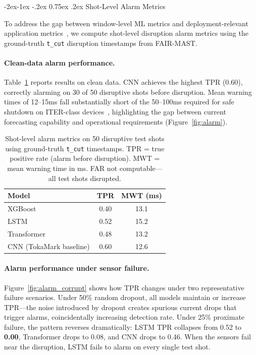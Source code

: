 \documentclass[10pt,twocolumn]{article}
\makeatletter
\renewcommand\subsection{\@startsection{subsection}{2}{\z@}%
  {-2ex\@plus -1ex \@minus -.2ex}%
  {0.75ex \@plus .2ex}%
  {\normalfont\large\bfseries}}
\makeatother
\begin{document}
\subsection{Shot-Level Alarm Metrics}
\label{sec:alarm}

To address the gap between window-level ML metrics and deployment-relevant
application metrics~\cite{rea2019, spangher2025}, we compute shot-level
disruption alarm metrics using the ground-truth \texttt{t\_cut}
disruption timestamps from FAIR-MAST.

\paragraph{Clean-data alarm performance.}
Table~\ref{tab:alarm} reports results on clean data. CNN achieves the
highest TPR (0.60), correctly alarming on 30 of 50 disruptive shots
before disruption. Mean warning times of 12--15ms fall substantially
short of the 50--100ms required for safe shutdown on ITER-class
devices~\cite{katesharbeck2019}, highlighting the gap between current
forecasting capability and operational requirements (Figure~\ref{fig:alarm}).

\begin{table}[H]
\centering
\caption{Shot-level alarm metrics on 50 disruptive test shots using
ground-truth \texttt{t\_cut} timestamps. TPR = true positive rate
(alarm before disruption). MWT = mean warning time in ms.
FAR not computable—all test shots disrupted.}
\label{tab:alarm}
\begin{tabular}{lcc}
\toprule
Model & TPR & MWT (ms) \\
\midrule
XGBoost                 & 0.40 & 13.1 \\
LSTM                    & 0.52 & 15.2 \\
Transformer             & 0.48 & 13.2 \\
CNN (TokaMark baseline) & 0.60 & 12.6 \\
\bottomrule
\end{tabular}
\end{table}

\paragraph{Alarm performance under sensor failure.}
Figure~\ref{fig:alarm_corrupt} shows how TPR changes under two
representative failure scenarios. Under 50\% random dropout, all
models maintain or increase TPR—the noise introduced by dropout
creates spurious current drops that trigger alarms, coincidentally
increasing detection rate. Under 25\% proximate failure, the
pattern reverses dramatically: LSTM TPR collapses from 0.52 to
\textbf{0.00}, Transformer drops to 0.08, and CNN drops to 0.46.
When the sensors fail near the disruption, LSTM fails to alarm on
every single test shot.
\end{document}

